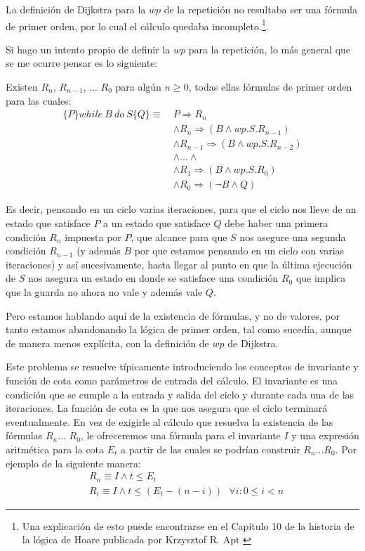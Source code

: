 \documentclass[12pt, a4paper, openany, fleqn]{book}
\begin{document}
    La definición de Dijkstra para la $wp$ de la repetición no resultaba ser una fórmula de primer orden, por lo cual el cálculo quedaba incompleto.\footnote{Una explicación de esto puede encontrarse en el Capítulo 10 de la historia de la lógica de Hoare publicada por Krzysztof R. Apt \cite{10.1007/s00165-019-00501-3}}.

    Si hago un intento propio de definir la $wp$ para la repetición, lo más general que se me ocurre pensar es lo siguiente:

    Existen $R_n$, $R_{n-1}$, ... $R_0$ para algún $n \geqslant 0$, todas ellas fórmulas de primer orden para las cuales:
    \begin{align*}
    \{P\}while\ B\ do\ S\{Q\} \equiv \ & P \Rightarrow R_n \\
                                     & \land R_n \Rightarrow (B \land wp.S.R_{n-1}) \\
                                     & \land R_{n-1} \Rightarrow (B \land wp.S.R_{n-2}) \\
                                     & \land ... \land \\
                                     & \land R_1 \Rightarrow (B \land wp.S.R_0) \\
                                     & \land R_0 \Rightarrow (\lnot B \land Q)
    \end{align*}

    Es decir, pensando en un ciclo varias iteraciones, para que el ciclo nos lleve de un estado que satisface $P$ a un estado que satisface $Q$ debe haber una primera condición $R_n$ impuesta por $P$, que alcance para que $S$ nos asegure una segunda condición $R_{n-1}$ (y además $B$ por que estamos pensando en un ciclo con varias iteraciones) y así sucesivamente, hasta llegar al punto en que la última ejecución de $S$ nos asegura un estado en donde se satisface una condición $R_0$ que implica que la guarda no ahora no vale y además vale $Q$.

    Pero estamos hablando aquí de la existencia de fórmulas, y no de valores, por tanto estamos abandonando la lógica de primer orden, tal como sucedía, aunque de manera menos explícita, con la definición de $wp$ de Dijkstra.

    Este problema se resuelve típicamente introduciendo los conceptos de invariante y función de cota como parámetros de entrada del cálculo. El invariante es una condición que se cumple a la entrada y salida del ciclo y durante cada una de las iteraciones. La función de cota es la que nos asegura que el ciclo terminará eventualmente. En vez de exigirle al cálculo que resuelva la existencia de las fórmulas $R_n$... $R_0$, le ofreceremos una fórmula para el invariante $I$ y una expresión aritmética para la cota $E_t$ a partir de las cuales se podrían construir $R_n$...$R_0$. Por ejemplo de la siguiente manera:
    \begin{align*}
        & R_n \equiv I \land t \leqslant E_t \\ 
        & R_i \equiv  I \land t \leqslant (E_t - (n - i)) \ \ \ \forall i : 0 \leqslant i < n
    \end{align*}
\end{document}

